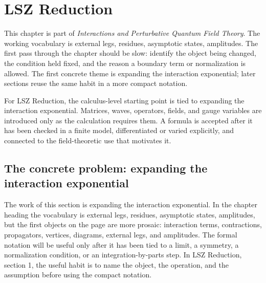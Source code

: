 \chapter{LSZ Reduction}


This chapter is part of \emph{Interactions and Perturbative Quantum Field Theory}.  The working vocabulary is external legs, residues, asymptotic states, amplitudes.  The first pass through the chapter should be slow: identify the object being changed, the condition held fixed, and the reason a boundary term or normalization is allowed.  The first concrete theme is expanding the interaction exponential; later sections reuse the same habit in a more compact notation.

For LSZ Reduction, the calculus-level starting point is tied to expanding the interaction exponential.  Matrices, waves, operators, fields, and gauge variables are introduced only as the calculation requires them.  A formula is accepted after it has been checked in a finite model, differentiated or varied explicitly, and connected to the field-theoretic use that motivates it.

\section{The concrete problem: expanding the interaction exponential}













The work of this section is expanding the interaction exponential.  In the chapter heading the vocabulary is external legs, residues, asymptotic states, amplitudes, but the first objects on the page are more prosaic: interaction terms, contractions, propagators, vertices, diagrams, external legs, and amplitudes.  The formal notation will be useful only after it has been tied to a limit, a symmetry, a normalization condition, or an integration-by-parts step.  In LSZ Reduction, section 1, the useful habit is to name the object, the operation, and the assumption before using the compact notation.

